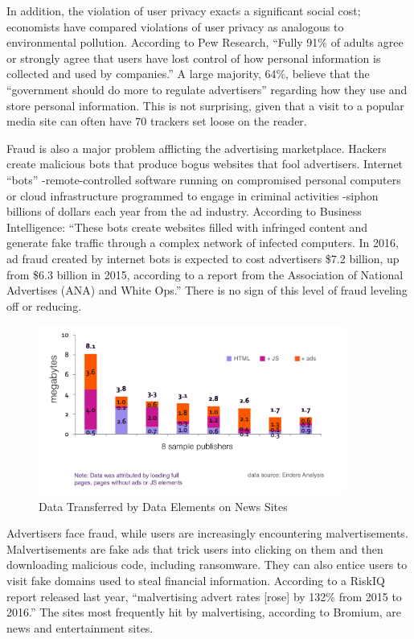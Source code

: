 \documentclass[11pt]{article}
\begin{document}
In addition, the violation of user privacy exacts a significant social cost; economists have compared violations of user privacy as analogous to environmental pollution.\cite{5} According to Pew Research, ``Fully 91\% of adults agree or strongly agree that users have lost control of how personal information is collected and used by companies.''\cite{6} A large majority, 64\%, believe that the ``government should do more to regulate advertisers'' regarding how they use and store personal information. This is not surprising, given that a visit to a popular media site can often have 70 trackers set loose on the reader. 

Fraud is also a major problem afflicting the advertising marketplace. Hackers create malicious bots that produce bogus websites that fool advertisers. Internet ``bots''  -remote-controlled software running on compromised personal computers or cloud infrastructure programmed to engage in criminal activities -siphon billions of dollars each year from the ad industry. According to Business Intelligence: ``These bots create websites filled with infringed content and generate fake traffic through a complex network of infected computers. In 2016, ad fraud created by internet bots is expected to cost advertisers \$7.2 billion, up from \$6.3 billion in 2015, according to a report from the Association of National Advertises (ANA) and White Ops.''\cite{7} There is no sign of this level of fraud leveling off or reducing. 

\begin{figure}
\begin{center}
\includegraphics[width=0.9\textwidth]{data_transfer_news_sites.png}
\caption{Data Transferred by Data Elements on News Sites}
\end{center}
\end{figure}



Advertisers face fraud, while users are increasingly encountering malvertisements. Malvertisements are fake ads that trick users into clicking on them and then downloading malicious code, including ransomware. They can also entice users to visit fake domains used to steal financial information. According to a RiskIQ report released last year, ``malvertising advert rates [rose] by 132\% from 2015 to 2016.'' The sites most frequently hit by malvertising, according to Bromium\cite{8}, are news and entertainment sites. 
\end{document}
